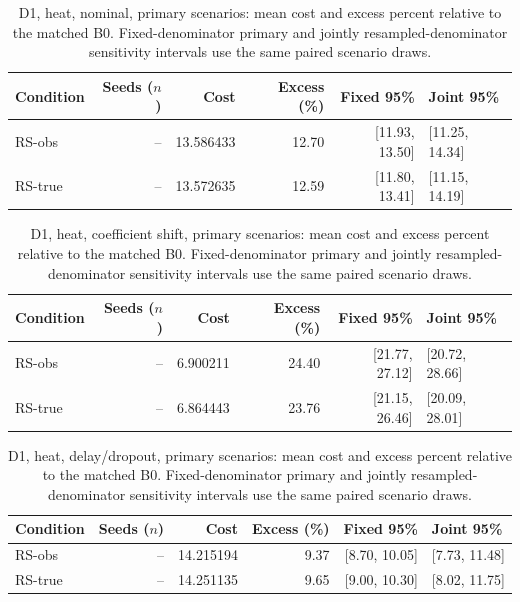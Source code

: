 \begin{table}[ht]
\centering\small
\caption{D1, heat, nominal, primary scenarios: mean cost and excess percent relative to the matched B0. Fixed-denominator primary and jointly resampled-denominator sensitivity intervals use the same paired scenario draws.}\label{tab:revision_cost_E1_heat_locked_nominal}
\begin{tabular}{@{}lrrrrl@{}}\toprule
Condition & Seeds ($n$) & Cost & Excess (\%) & Fixed 95\% & Joint 95\%\\\midrule
RS-obs & -- & 13.586433 & 12.70 & [11.93, 13.50] & [11.25, 14.34]\\
RS-true & -- & 13.572635 & 12.59 & [11.80, 13.41] & [11.15, 14.19]\\
\bottomrule\end{tabular}
\end{table}

\begin{table}[ht]
\centering\small
\caption{D1, heat, coefficient shift, primary scenarios: mean cost and excess percent relative to the matched B0. Fixed-denominator primary and jointly resampled-denominator sensitivity intervals use the same paired scenario draws.}\label{tab:revision_cost_E1_heat_locked_coefficient_ood}
\begin{tabular}{@{}lrrrrl@{}}\toprule
Condition & Seeds ($n$) & Cost & Excess (\%) & Fixed 95\% & Joint 95\%\\\midrule
RS-obs & -- & 6.900211 & 24.40 & [21.77, 27.12] & [20.72, 28.66]\\
RS-true & -- & 6.864443 & 23.76 & [21.15, 26.46] & [20.09, 28.01]\\
\bottomrule\end{tabular}
\end{table}

\begin{table}[ht]
\centering\small
\caption{D1, heat, delay/dropout, primary scenarios: mean cost and excess percent relative to the matched B0. Fixed-denominator primary and jointly resampled-denominator sensitivity intervals use the same paired scenario draws.}\label{tab:revision_cost_E1_heat_locked_delay_dropout}
\begin{tabular}{@{}lrrrrl@{}}\toprule
Condition & Seeds ($n$) & Cost & Excess (\%) & Fixed 95\% & Joint 95\%\\\midrule
RS-obs & -- & 14.215194 & 9.37 & [8.70, 10.05] & [7.73, 11.48]\\
RS-true & -- & 14.251135 & 9.65 & [9.00, 10.30] & [8.02, 11.75]\\
\bottomrule\end{tabular}
\end{table}

